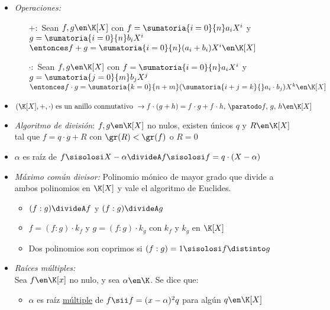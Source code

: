 \newcommand{\polGen}[1]{\sumatoria{i=0}{n} #1_i X^i}

\begin{itemize}
	\item \textit{Operaciones: }
	      \begin{itemize}
		      \item[$+:$] Sean $f,g \en \K[X]$ con $f = \polGen{a}$ y $g = \polGen{b}$\\
		            $\entonces f + g = \sumatoria{i=0}{n} (a_i + b_i) X^i \en \K[X]$
		      \item[$\cdot:$] Sean $f,g \en \K[X]$ con $f = \polGen{a}$ y $g = \sumatoria{j=0}{m} b_j X^j$\\
		            $\entonces f \cdot g = \sumatoria{k=0}{n+m} (\sumatoria{i+j=k}{} a_i \cdot b_j) X^k \en \K[X]$
	      \end{itemize}
	\item $(\K[X],+,\cdot) \text{ es un anillo conmutativo } \to f\cdot(g+h) = f\cdot g + f\cdot h,\, \paratodo f,\,g,\,h \en \K[X]$

	\item \textit{Algoritmo de división}: $f,g \en \K[X]$ no nulos, existen únicos $q$ y $R \en \K[X]$ tal que $f = q\cdot g + R$
            con $\gr(R) < \gr(f)$ o $R = 0$

	\item $\alpha$ es raíz de $f \sisolosi X - \alpha \divideA f \sisolosi f = q \cdot ( X - \alpha)$

	\item \textit{Máximo común divisor: } Polinomio mónico de mayor grado que divide a ambos polinomios en $\K[X]$
	      y vale el algoritmo de Euclides.
	      \begin{itemize}
		      \item $(f:g) \divideA f$ y $(f:g) \divideA g$

		      \item $f = (f:g)\cdot k_f$ y $g = (f:g)\cdot k_g$ con $k_f$ y $k_g$ en $\K[X]$

		      \item Dos polinomios son coprimos si $(f:g) = 1 \sisolosi f \distinto g$
	      \end{itemize}

	\item \textit{Raíces múltiples: }\\
	      Sea $f \en \K[x]$ no nulo, y sea $\alpha \en \K$. Se dice que:
	      \begin{itemize}
		      \item $\alpha$ es raíz \underline{múltiple} de $f \sii f = (x - \alpha)^2 q$ para algún $q \en \K[X]$


\end{itemize}
\end{itemize}
